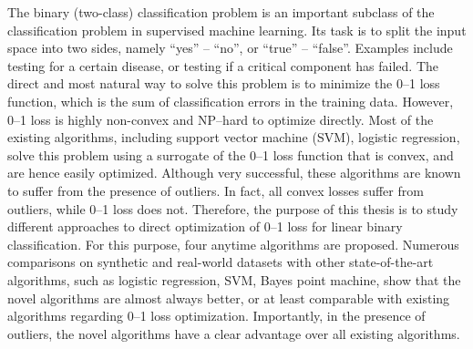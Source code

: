 The binary (two-class) classification problem is an important subclass
of the classification problem in supervised machine learning. Its task
is to split the input space into two sides, namely ``yes'' -- ``no'',
or ``true'' -- ``false''. Examples include testing for a certain
disease, or testing if a critical component has failed. The direct and
most natural way to solve this problem is to minimize the 0--1 loss
function, which is the sum of classification errors in the training
data. However, 0--1 loss is highly non-convex and NP--hard to optimize
directly. Most of the existing algorithms, including support vector
machine (SVM), logistic regression, solve this problem using a
surrogate of the 0--1 loss function that is convex, and are hence
easily optimized. Although very successful, these algorithms are known
to suffer from the presence of outliers. In fact, all convex losses
suffer from outliers, while 0--1 loss does not. Therefore, the purpose
of this thesis is to study different approaches to direct optimization
of 0--1 loss for linear binary classification. For this purpose, four
anytime algorithms are proposed.  Numerous comparisons on synthetic
and real-world datasets with other state-of-the-art algorithms, such
as logistic regression, SVM, Bayes point machine, show that the novel
algorithms are almost always better, or at least comparable with
existing algorithms regarding 0--1 loss optimization. Importantly, in
the presence of outliers, the novel algorithms have a clear advantage
over all existing algorithms.







